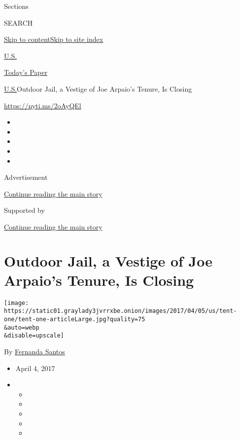 Sections

SEARCH

\protect\hyperlink{site-content}{Skip to
content}\protect\hyperlink{site-index}{Skip to site index}

\href{https://www.nytimes3xbfgragh.onion/section/us}{U.S.}

\href{https://myaccount.nytimes3xbfgragh.onion/auth/login?response_type=cookie\&client_id=vi}{}

\href{https://www.nytimes3xbfgragh.onion/section/todayspaper}{Today's
Paper}

\href{/section/us}{U.S.}\textbar{}Outdoor Jail, a Vestige of Joe
Arpaio's Tenure, Is Closing

\url{https://nyti.ms/2oAyQEl}

\begin{itemize}
\item
\item
\item
\item
\item
\end{itemize}

Advertisement

\protect\hyperlink{after-top}{Continue reading the main story}

Supported by

\protect\hyperlink{after-sponsor}{Continue reading the main story}

\hypertarget{outdoor-jail-a-vestige-of-joe-arpaios-tenure-is-closing}{%
\section{Outdoor Jail, a Vestige of Joe Arpaio's Tenure, Is
Closing}\label{outdoor-jail-a-vestige-of-joe-arpaios-tenure-is-closing}}

\texttt{[image: https://static01.graylady3jvrrxbe.onion/images/2017/04/05/us/tent-one/tent-one-articleLarge.jpg?quality=75\\\&auto=webp\\\&disable=upscale]}

By \href{http://www.nytimes3xbfgragh.onion/by/fernanda-santos}{Fernanda
Santos}

\begin{itemize}
\item
  April 4, 2017
\item
  \begin{itemize}
  \item
  \item
  \item
  \item
  \item
  \end{itemize}
\end{itemize}

